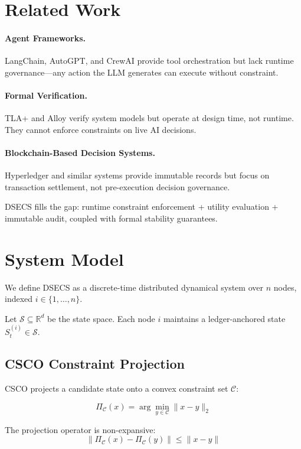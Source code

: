 \documentclass{article}
\begin{document}
\section{Related Work}

\paragraph{Agent Frameworks.}
LangChain, AutoGPT, and CrewAI provide tool orchestration but lack runtime
governance---any action the LLM generates can execute without constraint.

\paragraph{Formal Verification.}
TLA+ and Alloy verify system models but operate at design time, not runtime.
They cannot enforce constraints on live AI decisions.

\paragraph{Blockchain-Based Decision Systems.}
Hyperledger and similar systems provide immutable records but focus on
transaction settlement, not pre-execution decision governance.

DSECS fills the gap: runtime constraint enforcement + utility evaluation
+ immutable audit, coupled with formal stability guarantees.

\section{System Model}

We define DSECS as a discrete-time distributed dynamical system over
$n$ nodes, indexed $i \in \{1,\ldots,n\}$.

Let $\mathcal{S} \subseteq \mathbb{R}^d$ be the state space.
Each node $i$ maintains a ledger-anchored state $S_t^{(i)} \in \mathcal{S}$.

\subsection{CSCO Constraint Projection}

CSCO projects a candidate state onto a convex constraint set $\mathcal{C}$:

\[
\Pi_{\mathcal{C}}(x) = \arg\min_{y \in \mathcal{C}} \|x - y\|_2
\]

The projection operator is non-expansive:
\[
\|\Pi_{\mathcal{C}}(x) - \Pi_{\mathcal{C}}(y)\| \leq \|x - y\|
\]
\end{document}
